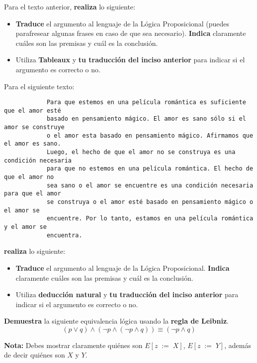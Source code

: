 \documentclass[oneside]{style}
\begin{document}
\begin{questions}[label=\protect\circled{\bfseries\arabic*}]
{        \vspace*{5mm}

        Para el texto anterior, \textbf{realiza} lo siguiente:
        \begin{itemize}
            \item \textbf{Traduce} el argumento al lenguaje de la Lógica 
            Proposicional (puedes parafresear algunas frases en caso de que sea 
            necesario). \textbf{Indica} claramente cuáles son las premisas y
            cuál es la conclusión.
            
            \item Utiliza \textbf{Tableaux} y \textbf{tu traducción del inciso 
            anterior} para indicar si el argumento es correcto o no. 
        \end{itemize}
    }

    \question
    {
        Para el siguiente texto:
        \begin{verbatim}
            Para que estemos en una película romántica es suficiente que el amor esté 
            basado en pensamiento mágico. El amor es sano sólo si el amor se construye 
            o el amor esta basado en pensamiento mágico. Afirmamos que el amor es sano.
            Luego, el hecho de que el amor no se construya es una condición necesaria
            para que no estemos en una película romántica. El hecho de que el amor no 
            sea sano o el amor se encuentre es una condición necesaria para que el amor 
            se construya o el amor esté basado en pensamiento mágico o el amor se 
            encuentre. Por lo tanto, estamos en una película romántica y el amor se 
            encuentra.
        \end{verbatim}

        \textbf{realiza} lo siguiente:
        \begin{itemize}
            \item \textbf{Traduce} el argumento al lenguaje de la Lógica 
            Proposicional. \textbf{Indica} claramente cuáles son las premisas 
            y cuál es la conclusión. 
            
            \item Utiliza \textbf{deducción natural} y \textbf{tu 
            traducción del inciso anterior} para indicar si el argumento es 
            correcto o no. 
        \end{itemize}
    }   
    
    \newpage
    \question
    {
        \textbf{Demuestra} la siguiente equivalencia lógica usando la 
        \textbf{regla de Leibniz}.
        \begin{equation*}
            (p \lor q) \land (\neg p \land (\neg p \land q)) \equiv 
            (\neg p \land q)
        \end{equation*}

        \textbf{Nota:} Debes mostrar claramente quiénes son $E[z \; := \; X]$, 
        $E[z \; := \; Y]$, además de decir quiénes son $X$ y $Y$. 
    }
\end{questions}
\end{document}

